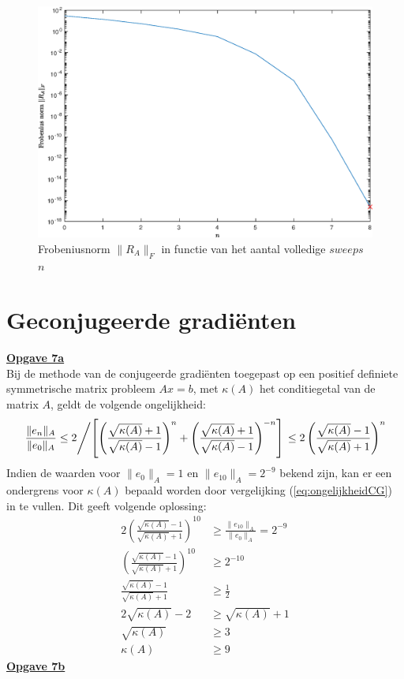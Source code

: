 \documentclass[a4paper, 12pt, titlepage, fleqn]{article}
\begin{document}
 \begin{figure}
 \centering
 \includegraphics[scale=0.55]{../Afbeeldingen/fout-jacobiSweep.eps}
 \caption{Frobeniusnorm $\|R_A\|_F$ in functie van het aantal volledige $sweeps$ $n$}
 \label{fig:sweeps}
 \end{figure}
\newpage




\section{Geconjugeerde gradi\"enten} \label{sec: geconjugeerde gradienten}
\underline{\textbf{Opgave 7a}}\\

Bij de methode van de conjugeerde gradi\"enten  toegepast op een positief definiete symmetrische matrix probleem $Ax = b$, met $\kappa(A)$ het conditiegetal van de matrix $A$, geldt de volgende ongelijkheid:
\begin{align}\label{eq:ongelijkheidCG}
\left.\frac{\|e_n\|_A}{\|e_0\|_A} \leq 2 \middle/ \left[ \left( \frac{\sqrt{\kappa(A)} + 1}{\sqrt{\kappa(A)} - 1}\right)^n + \left(\frac{\sqrt{\kappa(A)} + 1}{\sqrt{\kappa(A)} - 1}\right)^{-n}\right]\right. \leq 2\left(\frac{\sqrt{\kappa(A)} - 1}{\sqrt{\kappa(A)} + 1}\right)^n
\end{align}
Indien de waarden voor $\|e_0\|_A = 1$ en $\|e_{10}\|_A = 2^{-9}$ bekend zijn, kan er een ondergrens voor $\kappa(A)$ bepaald worden door vergelijking (\ref{eq:ongelijkheidCG}) in te vullen. Dit geeft volgende oplossing:
\begin{align*}
2\left(\frac{\sqrt{\kappa(A)} - 1}{\sqrt{\kappa(A)} + 1}\right)^{10} &\geq \frac{\|e_{10}\|_A}{\|e_0\|_A} = 2^{-9}\\
  \left(\frac{\sqrt{\kappa(A)} - 1}{\sqrt{\kappa(A)} + 1}\right)^{10} &\geq 2^{-10}\\
 \frac{\sqrt{\kappa(A)} - 1}{\sqrt{\kappa(A)} + 1} &\geq \frac{1}{2}\\
 2\sqrt{\kappa(A)} - 2 &\geq \sqrt{\kappa(A)} + 1\\
 \sqrt{\kappa(A)} &\geq 3\\
 \kappa(A) &\geq 9
 \end{align*}
 \underline{\textbf{Opgave 7b}}\\
\end{document}
